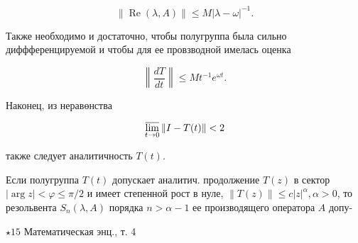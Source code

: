 \documentclass[10pt]{article}
\begin{document}
\[

\|\operatorname{Re}(\lambda, A)\| \leqslant M|\lambda-\omega|^{-1} .

\]



Также необходимо и достаточно, чтобы полугруппа была сильно диффференцируемой и чтобы для ее провзводной имелась оценка



\[

\left\|\frac{d T}{d t}\right\| \leqslant M t^{-1} e^{\omega t} .

\]



Наконец, из неравөнства



\[

\varlimsup_{t \rightarrow 0}\|I-T(t)\|<2

\]



также следует аналитичность $T(t)$.



Если полугруппа $T(t)$ допускает аналитич. продолжение $T(z)$ в сектор $|\arg z|<\varphi \leqslant \pi / 2$ и имеет степенной рост в нуле, $\|T(z)\| \leqslant c|z|^{\alpha}, \alpha>0$, то резольвента $S_{n}(\lambda, A)$ порядка $n>\alpha-1$ ее производящего оператора $A$ допу-



$\star 15$ Математическая энц., т. 4
\end{document}
